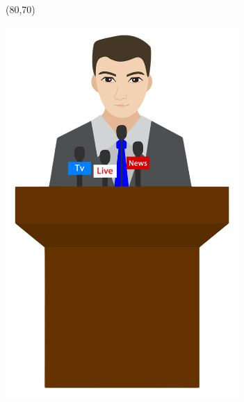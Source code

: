 \documentclass[hyperref={pdfpagelabels=false}]{beamer}
\begin{document}
\begin{frame}
	\begin{textblock}{10}(80,70)
		\begin{blankbox}
			\centering
			\includegraphics[height=400pt]{img/arn28-kj5eh.png}
		\end{blankbox}
	\end{textblock}


\end{frame}
\end{document}
